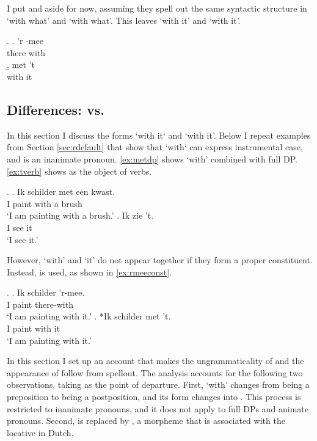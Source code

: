 \documentclass[12pt]{article}
\begin{document}
I put  and  aside for now, assuming they spell out the same syntactic structure in  `with what' and  `with what'. This leaves  `with it' and  `with it'.

\ex.
\ag. 'r -mee\\
there with\\
\b. met 't\\
with it\\



\subsection{Differences:  vs. }

In this section I discuss the forms  `with it` and  `with it'. Below I repeat examples from Section \ref{sec:rdefault} that show that  `with` can express instrumental case, and  is an inanimate pronoun. \ref{ex:metdp} shows  `with' combined with full DP. \ref{ex:tverb} shows  as the object of verbs.

\ex.
\ag. Ik schilder met een kwast.\\
 I paint with a brush\\
 `I am painting with a brush.'\label{ex:metdp}
 \bg. Ik zie 't.\\
  I see it\\
  `I see it.'\label{ex:tverb}

However,  `with' and  `it' do not appear together if they form a proper constituent. Instead,  is used, as shown in \ref{ex:rmeeconst}.

\ex.\label{ex:rmeeconst}
\ag. Ik schilder 'r-mee.\\
 I paint there-with\\
 `I am painting with it.'\label{ex:jarmee}
\bg. *Ik schilder met 't.\\
 I paint with it\\
 `I am painting with it.'\label{ex:neemett}

In this section I set up an account that makes the ungrammaticality of  and the appearance of  follow from spellout. The analysis accounts for the following two observations, taking  as the point of departure. First,  `with' changes from being a preposition to being a postposition, and its form changes into . This process is restricted to inanimate pronouns, and it does not apply to full DPs and animate pronouns. Second,  is replaced by , a morpheme that is associated with the locative in Dutch.
\end{document}
